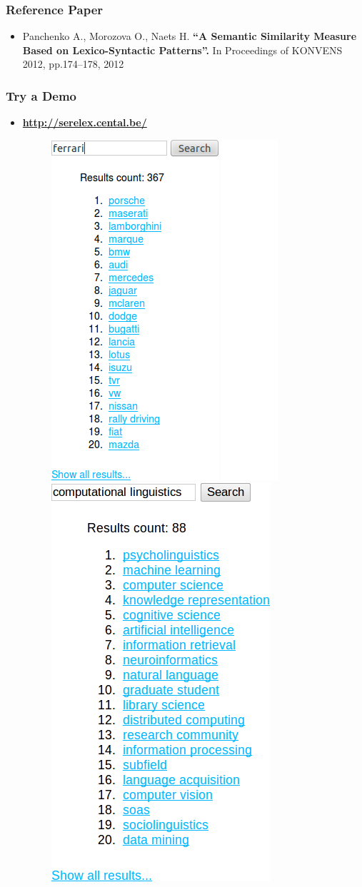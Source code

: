 \documentclass{beamer}
\begin{document}
\begin{frame}
\frametitle{Reference Paper}

\begin{itemize}
\item Panchenko A., Morozova O., Naets H. \textbf{“A Semantic Similarity Measure Based on Lexico-Syntactic Patterns''.} In Proceedings of KONVENS 2012, pp.174--178, 2012
\end{itemize}
\end{frame}

\begin{frame}
\frametitle{Try a Demo}

\begin{itemize}
  \item {\bf \url{http://serelex.cental.be/} }
  
\begin{figure}	
	\centering
		\includegraphics[height=0.6\textwidth]{figures/serelex}
		\includegraphics[height=0.5\textwidth]{figures/spacer}
		\includegraphics[height=0.6\textwidth]{figures/serelex-2}

\end{figure}
\end{itemize}
\end{frame}
\end{document}
